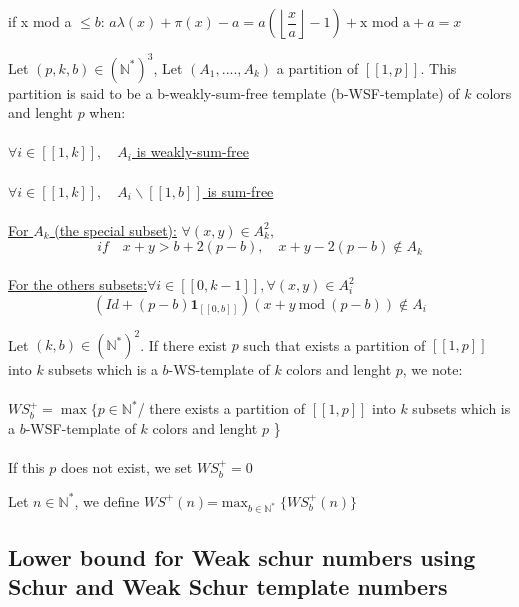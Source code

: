 \\\\if x mod a \(\leqslant b\):
\(a\lambda(x)+\pi(x)-a=a(\left\lfloor\dfrac{x}{a}\right\rfloor-1)+\text{x mod a}+a=x\)
\begin{definition}
Let \( (p,k,b) \in (\mathbb{N}^*)^3\), Let \((A_1,....,A_k)\) a partition of  \([\![1, p]\!]\).
This partition is said to be a b-weakly-sum-free template (b-WSF-template) of \(k\) colors and lenght \(p\) when:
\\\\
\underline{\(\forall i \in [\![1, k]\!], \quad A_i\) is weakly-sum-free}
\\\\
\underline{\(\forall i \in [\![1, k]\!], \quad A_i\backslash [\![1, b]\!]\) is sum-free}
\\\\
\underline{For \(A_k\) (the special subset):} \quad \(\forall (x,y) \in A_k^2,\)
\\
\[if \quad x+y>b+2(p-b),\quad x+y-2(p-b)\notin A_k\]
\\
\underline{For the others subsets:}\quad \(\forall i \in [\![0,k-1]\!], \forall(x,y) \in A_i^2\)
\\
\[
(Id+(p-b)\mathbf{1}_{ [\![0,b]\!]})(x+y ~\text{mod}~ (p-b)) \notin A_i
\]
\end{definition}

\begin{definition}
Let \( (k,b) \in (\mathbb{N}^*)^2\). If there exist \(p\) such that exists a partition of \([\![1, p]\!]\) into \(k\)
subsets which is a \(b\)-WS-template of \(k\) colors and lenght \(p\), we note:
\\\\\(WS_b^+=\max \{p\in \mathbb{N}^*\)/ there exists a partition of \([\![1, p]\!]\) into \(k\) subsets which is a
\(b\)-WSF-template of \(k\) colors and lenght \(p\) \}
\\\\
If this \(p\) does not exist, we set \(WS_b^+= 0\)
\end{definition}

\begin{definition}
Let \( n \in \mathbb{N}^*\), we define \(WS^+(n)\)=\(\max_{b\in \mathbb{N}^*} \{WS_b^+(n)\}\)
\end{definition}


\subsection{Lower bound for Weak schur numbers using Schur and Weak Schur template numbers}


